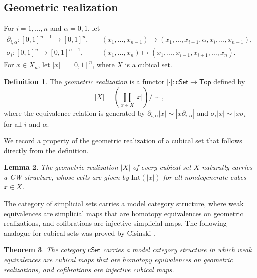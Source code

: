 \documentclass[oneside, 12pt]{amsart}
\numberwithin{equation}{section}
\theoremstyle{plain}
\newtheorem{theorem}{Theorem}[section]
\newtheorem{lemma}[theorem]{Lemma}
\theoremstyle{definition}
\newtheorem{definition}[theorem]{Definition}
\theoremstyle{remark}
\newcommand{\cSet}{\mathsf{cSet}}
\begin{document}
	
	\subsection{Geometric realization}
	
	For $i=1,\ldots,n$ and $\alpha=0,1$, let
	\begin{align*}
		\partial_{i,\alpha}\colon [0,1]^{n-1}\to [0,1]^n,&\quad(x_1,\ldots,x_{n-1})\mapsto(x_1,\ldots,x_{i-1},\alpha,x_i,\ldots,x_{n-1}),\\
		\sigma_i\colon [0,1]^n\to [0,1]^{n-1},&\quad(x_1,\ldots,x_n)\mapsto(x_1,\ldots,x_{i-1},x_{i+1},\ldots,x_n).
	\end{align*}
	For $x\in X_n$, let $|x|=[0,1]^n$, where $X$ is a cubical set.
	
	
	
	\begin{definition}
		The \emph{geometric realization} is a functor $|\cdot|\colon\cSet\to\mathsf{Top}$ defined by
		\[
		|X|=\left(\coprod_{x\in X}|x|\right)/\sim,
		\]
		where the equivalence relation is generated by $\partial_{i,\alpha}|x|\sim|x\partial_{i,\alpha}|$ and $\sigma_i|x|\sim|x\sigma_i|$ for all $i$ and $\alpha$.
	\end{definition}
	
	
	
	We record a property of the geometric realization of a cubical set that follows directly from the definition.
	
	
	
	\begin{lemma}
		\label{realization CW}
		The geometric realization $|X|$ of every cubical set $X$ naturally carries a CW structure, whose cells are given by $\mathrm{Int}(|x|)$ for all nondegenerate cubes $x\in X$.
	\end{lemma}
	
	
	
	The category of simplicial sets carries a model category structure, where weak equivalences are simplicial maps that are homotopy equivalences on geometric realizations, and cofibrations are injective simplicial maps. The following analogue for cubical sets was proved by Cisinski \cite{C}.
	
	
	
	\begin{theorem}
		\label{cSet model structure}
		The category $\cSet$ carries a model category structure in which weak equivalences are cubical maps that are homotopy equivalences on geometric realizations, and cofibrations are injective cubical maps.
	\end{theorem}
	
\end{document}
